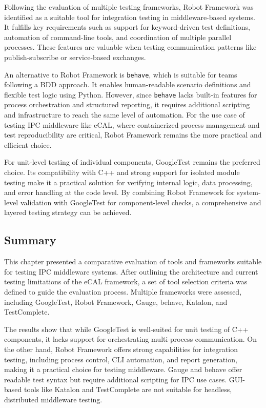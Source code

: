 Following the evaluation of multiple testing frameworks, Robot Framework was identified as a suitable tool for integration testing in middleware-based systems. It fulfills key requirements such as support for keyword-driven test definitions, automation of command-line tools, and coordination of multiple parallel processes. These features are valuable when testing communication patterns like publish-subscribe or service-based exchanges.

\vspace{1em}
An alternative to Robot Framework is \texttt{behave}, which is suitable for teams following a BDD approach. It enables human-readable scenario definitions and flexible test logic using Python. However, since \texttt{behave} lacks built-in features for process orchestration and structured reporting, it requires additional scripting and infrastructure to reach the same level of automation. For the use case of testing IPC middleware like eCAL, where containerized process management and test reproducibility are critical, Robot Framework remains the more practical and efficient choice.

\vspace{2em}
For unit-level testing of individual components, GoogleTest remains the preferred choice. Its compatibility with C++ and strong support for isolated module testing make it a practical solution for verifying internal logic, data processing, and error handling at the code level. By combining Robot Framework for system-level validation with GoogleTest for component-level checks, a comprehensive and layered testing strategy can be achieved.

\subsection{Summary}

This chapter presented a comparative evaluation of tools and frameworks suitable for testing IPC middleware systems. After outlining the architecture and current testing limitations of the eCAL framework, a set of tool selection criteria was defined to guide the evaluation process. Multiple frameworks were assessed, including GoogleTest, Robot Framework, Gauge, behave, Katalon, and TestComplete.

\vspace{0.5em}
The results show that while GoogleTest is well-suited for unit testing of C++ components, it lacks support for orchestrating multi-process communication. On the other hand, Robot Framework offers strong capabilities for integration testing, including process control, CLI automation, and report generation, making it a practical choice for testing middleware. Gauge and behave offer readable test syntax but require additional scripting for IPC use cases. GUI-based tools like Katalon and TestComplete are not suitable for headless, distributed middleware testing.

